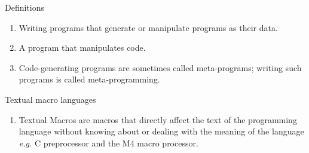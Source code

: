 \begin{frame}{Definitions}
\begin{enumerate}
\item Writing programs that generate or manipulate programs as their data.
\item A program that manipulates code.
\item Code-generating programs are sometimes called meta-programs; writing such programs
    is called meta-programming.
\end{enumerate}
\end{frame}

\begin{frame}{Textual macro languages}
\begin{enumerate}
\item Textual Macros are macros that directly affect the text of the programming 
    language without knowing about or dealing with the meaning of the language \emph{e.g.} C 
    preprocessor and the M4 macro processor. 
\end{enumerate}
\end{frame}


